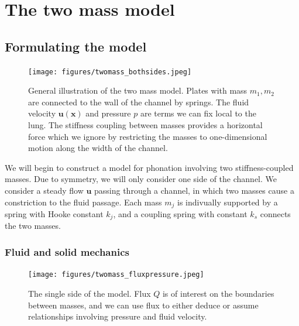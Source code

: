


%


\chapter{The two mass model}

\section{Formulating the model}

\begin{figure}[h!]
    \centering
    \texttt{[image: figures/twomass\_bothsides.jpeg]}
    \caption{General illustration of the two mass model. Plates with mass ${m_1},{m_2}$ are connected to the wall of the channel by springs.
    The fluid velocity $\bm{u(x)}$ and pressure $p$ are terms we can fix local to the lung.
    The stiffness coupling between masses provides a horizontal force which we ignore by restricting the masses to one-dimensional motion along the width of the channel.}
    \label{fig:twomass_bothsides}
\end{figure}

We will begin to construct a model for phonation involving two stiffness-coupled masses.
Due to symmetry, we will only consider one side of the channel.
We consider a steady flow $\mathbf{u}$ passing through a channel,
in which two masses cause a constriction to the fluid passage.
Each mass $m_j$ is indivually supported by a spring with Hooke constant $k_j$,
and a coupling spring with constant $k_s$ connects the two masses.

\subsection{Fluid and solid mechanics}

\begin{figure}[h!]
	\centering
	\texttt{[image: figures/twomass\_fluxpressure.jpeg]}
	\caption{The single side of the model.
		Flux $Q$ is of interest on the boundaries between masses,
		and we can use flux to either deduce or assume relationships involving pressure and fluid velocity.
	}
	\label{fig:twomass_fluxpressure}
\end{figure}

